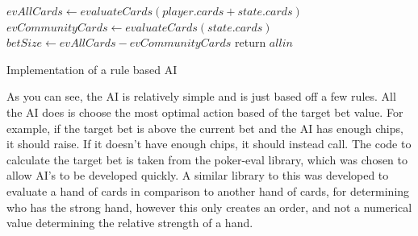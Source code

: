 \vspace{0.3cm}

\begin{algorithm}[H]
    \BlankLine{}
     $evAllCards \leftarrow evaluateCards(player.cards + state.cards)$\;
     $evCommunityCards \leftarrow evaluateCards(state.cards)$\;
     $betSize \leftarrow evAllCards - evCommunityCards$\;
     
                    {
                        return $allin$\;
                   }
\caption{Implementation of a rule based AI}%
\label{code:rule-based-ai}
\end{algorithm}

\vspace{0.3cm}

As you can see, the AI is relatively simple and is just based off a few rules.
All the AI does is choose the most optimal action based of the target bet
value. For example, if the target bet is above the current bet and the AI
has enough chips, it should raise. If it doesn't have enough chips, it should
instead call. The code to calculate the target bet is taken from the
poker-eval \parencite{code:dachary2004} library, which was chosen to allow
AI's to be developed quickly. A similar library to this was developed to
evaluate a hand of cards in comparison to another hand of cards, for determining
who has the strong hand, however this only creates an order, and not a
numerical value determining the relative strength of a hand.

